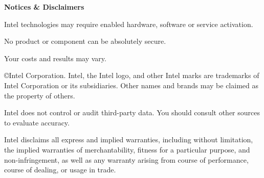 \begin{framed}
\scriptsize

\noindent \textbf{Notices \& Disclaimers}

\noindent Intel technologies may require enabled hardware, software or service activation.

\noindent No product or component can be absolutely secure.

\noindent Your costs and results may vary. 

\noindent \copyright Intel Corporation.  Intel, the Intel logo, and other Intel marks are trademarks of Intel Corporation or its subsidiaries.  Other names and brands may be claimed as the property of others. 

\noindent Intel does not control or audit third-party data.  You should consult other sources to evaluate accuracy.

\noindent Intel disclaims all express and implied warranties, including without limitation, the implied warranties of merchantability, fitness for a particular purpose, and non-infringement, as well as any warranty arising from course of performance, course of dealing, or usage in trade.







\end{framed}
